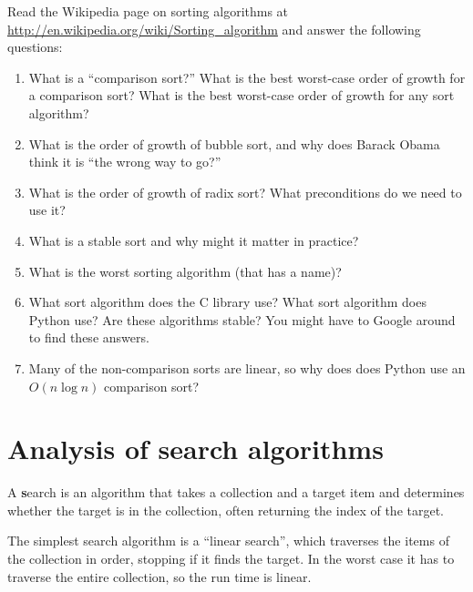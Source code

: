 \documentclass[
DIV=11,
fontsize=13,
twoside,
headinclude=false,
titlepage=firstiscover,
abstract=true,
headsepline=true,
footsepline=true,
chapterprefix=true, %
headings=big,
bibliography=totoc,%
captions=tableheading
]{scrbook}
\theoremstyle{definition}
\begin{document}
\begin{exercise}
\normalfont

Read the Wikipedia page on sorting algorithms at
\url{http://en.wikipedia.org/wiki/Sorting_algorithm} and answer
the following questions:

\begin{enumerate}

\item What is a ``comparison sort?'' What is the best worst-case order
  of growth for a comparison sort?  What is the best worst-case order
  of growth for any sort algorithm?

\item What is the order of growth of bubble sort, and why does Barack
  Obama think it is ``the wrong way to go?''

\item What is the order of growth of radix sort?  What preconditions
  do we need to use it?

\item What is a stable sort and why might it matter in practice?

\item What is the worst sorting algorithm (that has a name)?

\item What sort algorithm does the C library use?  What sort algorithm
  does Python use?  Are these algorithms stable?  You might have to
  Google around to find these answers.

\item Many of the non-comparison sorts are linear, so why does does
  Python use an $O(n \log n)$ comparison sort?

\end{enumerate}

\end{exercise}


\section{Analysis of search algorithms}

A {\textbf search} is an algorithm that takes a collection and a target
item and determines whether the target is in the collection, often
returning the index of the target.

The simplest search algorithm is a ``linear search'', which traverses
the items of the collection in order, stopping if it finds the target.
In the worst case it has to traverse the entire collection, so the run
time is linear.
\end{document}
